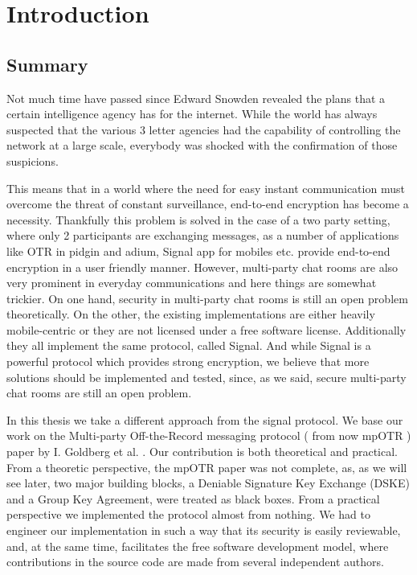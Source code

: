 \chapter{Introduction}

\label{chapter:introduction}

\newcommand{\dhname}{Diffie--Hellman}
\newcommand{\tdhname}{Triple Diffie--Hellman}



\section{Summary}

Not much time have passed since Edward Snowden revealed the plans that a certain intelligence agency has for the internet.
While the world has always suspected that the various 3 letter agencies had the capability of controlling the network at a large scale, everybody was shocked with the confirmation of those suspicions.

This means that in a world where the need for easy instant communication must overcome the threat of constant surveillance, end-to-end encryption has become a necessity.
Thankfully this problem is solved in the case of a two party setting, where only 2 participants are exchanging messages, as a number of applications like OTR in pidgin and adium, Signal app for mobiles etc. provide end-to-end encryption in a user friendly manner.
However, multi-party chat rooms are also very prominent in everyday communications and here things are somewhat trickier.
On one hand, security in multi-party chat rooms is still an open problem theoretically.
On the other, the existing implementations are either heavily mobile-centric or they are not licensed under a free software license.
Additionally they all implement the same protocol, called Signal.
And while Signal is a powerful protocol which provides strong encryption, we believe that more solutions should be implemented and tested, since, as we said, secure multi-party chat rooms are still an open problem.

In this thesis we take a different approach from the signal protocol.
We base our work on the Multi-party Off-the-Record messaging protocol ( from now mpOTR ) paper by I. Goldberg et al. \cite{mpotr}.
Our contribution is both theoretical and practical.
From a theoretic perspective, the mpOTR paper was not complete, as, as we will see later, two major building blocks, a Deniable Signature Key Exchange (DSKE) and a Group Key Agreement, were treated as black boxes.
From a practical perspective we implemented the protocol almost from nothing. We had to engineer our implementation in such a way that its security is easily reviewable, and, at the same time, facilitates the free software development model, where contributions in the source code are made from several independent authors.

